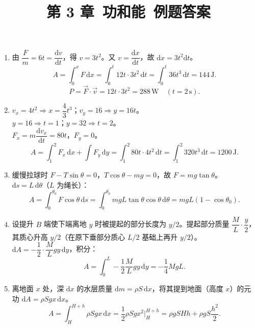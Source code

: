\documentclass[12pt]{article}
\title{第 3 章\ 功和能\ 例题答案}
\author{}
\date{}
\begin{document}
\maketitle

\begin{enumerate}[label=\textbf{例\arabic*.}, leftmargin=*]

\item 由 $\dfrac{F}{m} = 6t = \dfrac{\mathrm{d}v}{\mathrm{d}t}$，得 $v = 3t^2$。又 $v = \dfrac{\mathrm{d}x}{\mathrm{d}t}$，故 $\mathrm{d}x = 3t^2\mathrm{d}t$。
\[
  A = \int_0^x F\,\mathrm{d}x = \int_0^t 12t \cdot 3t^2\,\mathrm{d}t = \int_0^t 36t^3\,\mathrm{d}t = 144\,\mathrm{J}.
\]
\[
  P = \vec{F}\cdot\vec{v} = 12t \cdot 3t^2 = 288\,\mathrm{W} \quad (t=2\,\mathrm{s}).
\]

\item $v_x = 4t^2 \Rightarrow x = \dfrac{4}{3}t^3$；$v_y = 16 \Rightarrow y = 16t$。\\
$y=16 \Rightarrow t=1$；$y=32 \Rightarrow t=2$。\\
$F_x = m\dfrac{\mathrm{d}v_x}{\mathrm{d}t} = 80t$，$F_y = 0$。
\[
  A = \int_1^2 F_x\,\mathrm{d}x + \int F_y\,\mathrm{d}y = \int_1^2 80t \cdot 4t^2\,\mathrm{d}t = \int_1^2 320t^3\,\mathrm{d}t = 1200\,\mathrm{J}.
\]

\item 缓慢拉球时 $F - T\sin\theta = 0$，$T\cos\theta - mg = 0$，故 $F = mg\tan\theta$。\\
$\mathrm{d}s = L\,\mathrm{d}\theta$（$L$ 为绳长）：
\[
  A = \int_0^{\theta_0} F\cos\theta\,\mathrm{d}s = \int_0^{\theta_0} mgL\tan\theta\cos\theta\,\mathrm{d}\theta = mgL(1-\cos\theta_0).
\]

\item 设提升 $B$ 端使下端离地 $y$ 时被提起的部分长度为 $y/2$。提起部分质量 $\dfrac{M}{L}\cdot\dfrac{y}{2}$，其质心升高 $y/2$（在原下垂部分质心 $L/2$ 基础上再升 $y/2$）。\\
$\mathrm{d}A = -\dfrac{1}{2}\cdot\dfrac{M}{L}gy\,\mathrm{d}y$，积分：
\[
  A = \int_0^L -\frac{1}{2}\frac{M}{L}gy\,\mathrm{d}y = -\frac{1}{4}MgL.
\]

\item 离地面 $x$ 处，深 $\mathrm{d}x$ 的水层质量 $\mathrm{d}m = \rho S\,\mathrm{d}x$，将其提到地面（高度 $x$）的元功 $\mathrm{d}A = \rho S g x\,\mathrm{d}x$。
\[
  A = \int_H^{H+h} \rho S g x\,\mathrm{d}x = \frac{1}{2}\rho S g x^2\Big|_H^{H+h} = \rho g S H h + \rho g S \frac{h^2}{2}.
\]


\end{enumerate}
\end{document}
